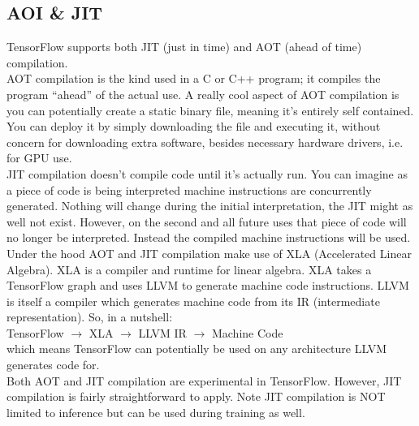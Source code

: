 \documentclass[12pt, draft]{report}
\begin{document}
\subsection*{AOI \& JIT}
\begin{changemargin}{0.5cm}{2.0cm}
TensorFlow supports both JIT (just in time) and AOT (ahead of time) compilation.\vspace{0.5cm}\\
AOT compilation is the kind used in a C or C++ program; it compiles the program “ahead” of the actual use.
A really cool aspect of AOT compilation is you can potentially create a static binary file, meaning it’s
entirely self contained. You can deploy it by simply downloading the file and executing it, without concern
for downloading extra software, besides necessary hardware drivers, i.e. for GPU use.\vspace{0.5cm}\\
JIT compilation doesn’t compile code until it’s actually run. You can imagine as a piece of code is being
interpreted machine instructions are concurrently generated. Nothing will change during the initial interpretation,
the JIT might as well not exist. However, on the second and all future uses that piece of code will no longer
be interpreted. Instead the compiled machine instructions will be used.\vspace{0.5cm}\\
Under the hood AOT and JIT compilation make use of XLA (Accelerated Linear Algebra). XLA is a compiler and
runtime for linear algebra. XLA takes a TensorFlow graph and uses LLVM to generate machine code instructions.
LLVM is itself a compiler which generates machine code from its IR (intermediate representation). So, in a
nutshell:\vspace{0.5cm}\\
\-\hspace{1.0cm}TensorFlow $\rightarrow$ XLA $\rightarrow$ LLVM IR $\rightarrow$ Machine Code\vspace{0.5cm}\\
which means TensorFlow can potentially be used on any architecture LLVM generates code for.\vspace{0.5cm}\\
Both AOT and JIT compilation are experimental in TensorFlow. However, JIT compilation is fairly straightforward
to apply. Note JIT compilation is NOT limited to inference but can be used during training as well.
\end{changemargin}
\end{document}
